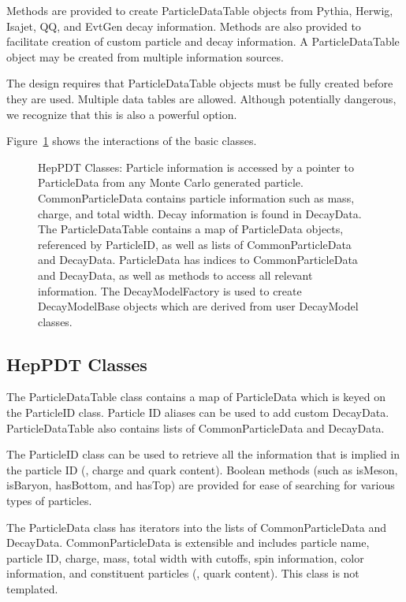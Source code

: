 Methods are provided to create ParticleDataTable objects from
Pythia, Herwig, Isajet, QQ, and EvtGen decay information.  Methods
are also provided to facilitate creation of custom particle and
decay information.  A ParticleDataTable object may be created from
multiple information sources.

The design requires that ParticleDataTable objects must be fully created
before they are used.  Multiple data tables are allowed.  Although
potentially dangerous, we recognize that this is also a powerful option.

Figure~\ref{fig:a} shows the interactions of the basic classes.

\begin{figure}
\caption{HepPDT Classes: 
Particle information is accessed by a pointer to ParticleData from any
Monte Carlo generated particle.  
CommonParticleData contains particle information such as mass, charge,
and total width.  Decay information is found in DecayData.
The ParticleDataTable contains a map of ParticleData objects,
referenced by ParticleID, as well as lists of CommonParticleData and DecayData.
ParticleData has indices to CommonParticleData and DecayData, as well as
methods to access all relevant information.  
The DecayModelFactory is used to create DecayModelBase objects
which are derived from user DecayModel classes. }
\label{fig:a}
\end{figure}

\subsection{HepPDT Classes}

The ParticleDataTable class contains a map of ParticleData
which is keyed on the ParticleID class.  Particle ID aliases can be used
to add custom DecayData.  ParticleDataTable also contains lists
of CommonParticleData and DecayData.

The ParticleID
class can be used to retrieve all the information that is implied 
in the particle ID (\eg, charge and quark content).   Boolean methods
(such as isMeson, isBaryon, hasBottom, and hasTop) are provided
for ease of searching for various types of particles.

The ParticleData class has iterators into the lists
of CommonParticleData and DecayData.   CommonParticleData is extensible
and includes particle name, particle ID, charge,
mass, total width with cutoffs, spin information, color information, 
and constituent particles (\eg, quark content).  
This class is not templated.

